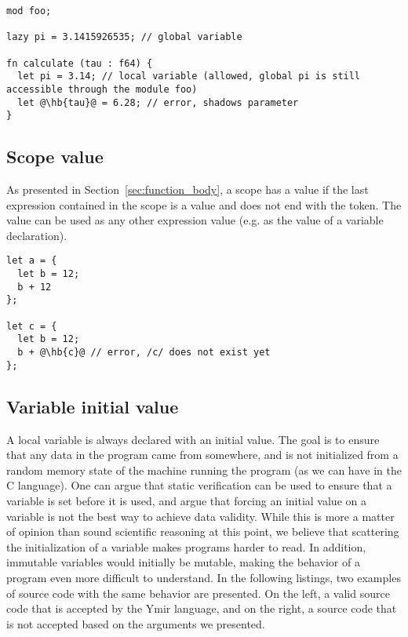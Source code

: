 \begin{lstlisting}[style=coloredverbatim, escapechar=@]
mod foo;

lazy pi = 3.1415926535; // global variable

fn calculate (tau : f64) {
  let pi = 3.14; // local variable (allowed, global pi is still accessible through the module foo)
  let @\hb{tau}@ = 6.28; // error, shadows parameter
}

\end{lstlisting}

\subsection{Scope value}

As presented in Section~\ref{sec:function_body}, a scope has a value if the last
expression contained in the scope is a value and does not end with the \token{;}
token. The value can be used as any other expression value (e.g. as the value of
a variable declaration).

\begin{lstlisting}[style=coloredverbatim, escapechar=@]
let a = {
  let b = 12;
  b + 12
};

let c = {
  let b = 12;
  b + @\hb{c}@ // error, /c/ does not exist yet
};
\end{lstlisting}

\subsection{Variable initial value}

A local variable is always declared with an initial value. The goal is to ensure
that any data in the program came from somewhere, and is not initialized from a
random memory state of the machine running the program (as we can have in the C
language). One can argue that static verification can be used to ensure that a
variable is set before it is used, and argue that forcing an initial value on a
variable is not the best way to achieve data validity. While this is more a
matter of opinion than sound scientific reasoning at this point, we believe that
scattering the initialization of a variable makes programs harder to read. In
addition, immutable variables would initially be mutable, making the behavior of
a program even more difficult to understand. In the following listings, two
examples of source code with the same behavior are presented. On the left, a
valid source code that is accepted by the Ymir language, and on the right, a
source code that is not accepted based on the arguments we presented.


